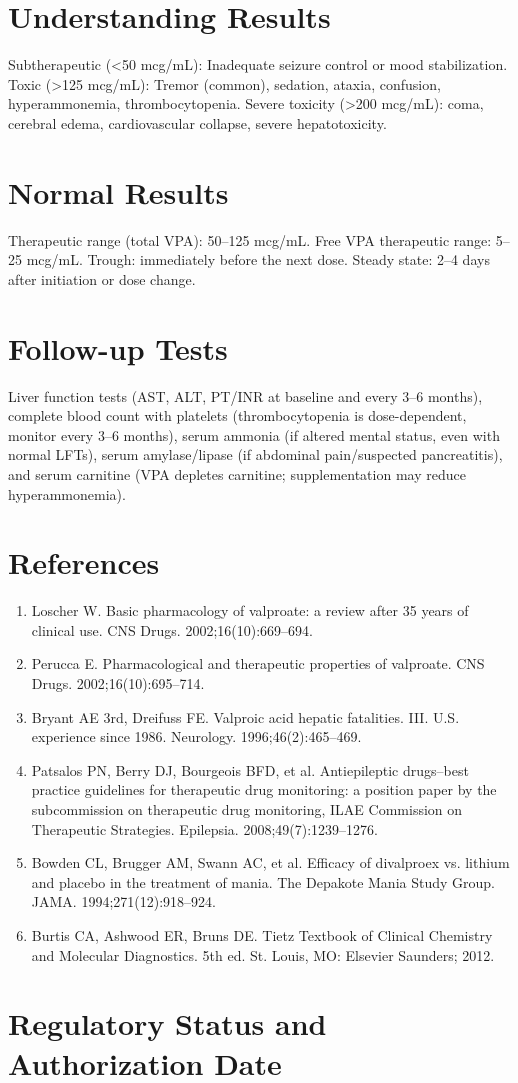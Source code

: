 \section*{Understanding Results}
Subtherapeutic (<50 mcg/mL): Inadequate seizure control or mood stabilization. Toxic (>125 mcg/mL): Tremor (common), sedation, ataxia, confusion, hyperammonemia, thrombocytopenia. Severe toxicity (>200 mcg/mL): coma, cerebral edema, cardiovascular collapse, severe hepatotoxicity.
\section*{Normal Results}
Therapeutic range (total VPA): 50--125 mcg/mL. Free VPA therapeutic range: 5--25 mcg/mL. Trough: immediately before the next dose. Steady state: 2--4 days after initiation or dose change.
\section*{Follow-up Tests}
Liver function tests (AST, ALT, PT/INR at baseline and every 3--6 months), complete blood count with platelets (thrombocytopenia is dose-dependent, monitor every 3--6 months), serum ammonia (if altered mental status, even with normal LFTs), serum amylase/lipase (if abdominal pain/suspected pancreatitis), and serum carnitine (VPA depletes carnitine; supplementation may reduce hyperammonemia).
\section*{References}
\begin{enumerate}
  \item Loscher W. Basic pharmacology of valproate: a review after 35 years of clinical use. CNS Drugs. 2002;16(10):669--694.
  \item Perucca E. Pharmacological and therapeutic properties of valproate. CNS Drugs. 2002;16(10):695--714.
  \item Bryant AE 3rd, Dreifuss FE. Valproic acid hepatic fatalities. III. U.S. experience since 1986. Neurology. 1996;46(2):465--469.
  \item Patsalos PN, Berry DJ, Bourgeois BFD, et al. Antiepileptic drugs--best practice guidelines for therapeutic drug monitoring: a position paper by the subcommission on therapeutic drug monitoring, ILAE Commission on Therapeutic Strategies. Epilepsia. 2008;49(7):1239--1276.
  \item Bowden CL, Brugger AM, Swann AC, et al. Efficacy of divalproex vs. lithium and placebo in the treatment of mania. The Depakote Mania Study Group. JAMA. 1994;271(12):918--924.
  \item Burtis CA, Ashwood ER, Bruns DE. Tietz Textbook of Clinical Chemistry and Molecular Diagnostics. 5th ed. St. Louis, MO: Elsevier Saunders; 2012.
\end{enumerate}
\clearpage
\section*{Regulatory Status and Authorization Date}

\clearpage
